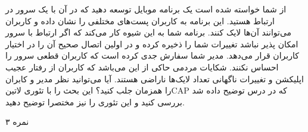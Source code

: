 \documentclass[../main.tex]{subfiles}
\begin{document}

از شما خواسته شده است یک برنامه موبایل توسعه دهید که در آن با یک سرور در ارتباط هستید. این برنامه به کاربران پست‌های مختلفی را نشان داده و کاربران می‌توانند آن‌ها لایک کنند. برنامه شما به این شیوه کار می‌کند که اگر ارتباط با سرور امکان پذیر نباشد تغییرات شما را ذخیره کرده و در اولین اتصال صحیح آن را در اختیار کاربران قرار می‌دهد. مدیر شما سفارش جدی کرده است که کاربران قطعی سرور را احساس نکنند. شکایات مردمی حاکی از این می‌باشد که کاربران از رفتار عجیب اپلیکشن و تغییرات ناگهانی تعداد لایک‌ها ناراضی هستند. آیا می‌توانید نظر مدیر و کابران را همزمان جلب کنید؟ این بحث را با تئوری ‌لاتین{CAP} که در درس توضیح داده شد بررسی کنید و این تئوری را نیز مختصرا توضیح دهید.

۳ نمره
\end{document}

